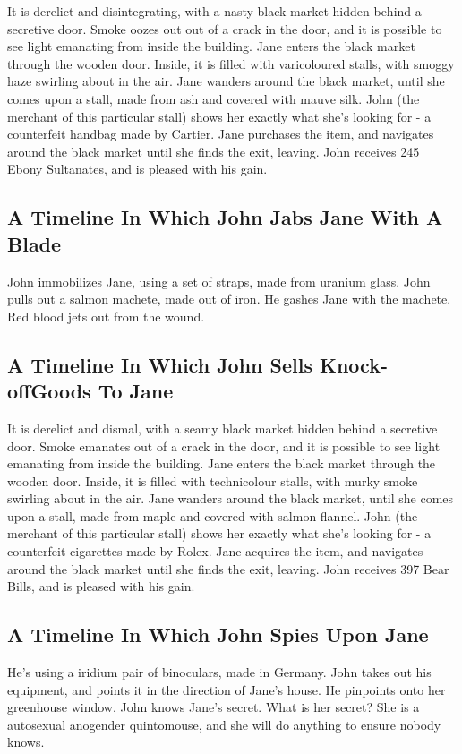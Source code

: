 \documentclass{article}
\begin{document}
It is derelict and disintegrating, with a nasty black market hidden behind a secretive door.
Smoke oozes out out of a crack in the door, and it is possible to see light emanating from inside the building.
Jane enters the black market through the wooden door.
Inside, it is filled with varicoloured stalls, with smoggy haze swirling about in the air.
Jane wanders around the black market, until she comes upon a stall, made from ash and covered with mauve silk.
John (the merchant of this particular stall) shows her exactly what she's looking for {-} a counterfeit handbag made by Cartier.
Jane purchases the item, and navigates around the black market until she finds the exit, leaving.
John receives 245 Ebony Sultanates, and is pleased with his gain.
\subsection{A Timeline In Which John Jabs Jane With A Blade}


John immobilizes Jane, using a set of straps, made from uranium glass.
John pulls out a salmon machete, made out of iron.
He gashes Jane with the machete.
Red blood jets out from the wound.
\subsection{A Timeline In Which John Sells Knock{-}offGoods To Jane}


It is derelict and dismal, with a seamy black market hidden behind a secretive door.
Smoke emanates out of a crack in the door, and it is possible to see light emanating from inside the building.
Jane enters the black market through the wooden door.
Inside, it is filled with technicolour stalls, with murky smoke swirling about in the air.
Jane wanders around the black market, until she comes upon a stall, made from maple and covered with salmon flannel.
John (the merchant of this particular stall) shows her exactly what she's looking for {-} a counterfeit cigarettes made by Rolex.
Jane acquires the item, and navigates around the black market until she finds the exit, leaving.
John receives 397 Bear Bills, and is pleased with his gain.
\subsection{A Timeline In Which John Spies Upon Jane}


He's using a iridium pair of binoculars, made in Germany.
John takes out his equipment, and points it in the direction of Jane's house. He pinpoints onto her greenhouse window.
John knows Jane's secret. What is her secret? She is a autosexual anogender quintomouse, and she will do anything to ensure nobody knows.
\end{document}
